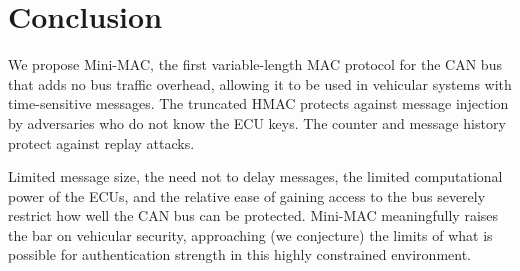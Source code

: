 \section{Conclusion}
\label{conclude}

We propose Mini-MAC, the first variable-length MAC protocol for the CAN bus that adds no bus traffic overhead, 
allowing it to be used in vehicular systems with time-sensitive messages.  The truncated HMAC protects against
message injection by adversaries who do not know the ECU keys.  The counter and message history protect
against replay attacks.  

Limited message size, the need not to delay messages, the limited computational power of the ECUs,
and the relative ease of gaining access to the bus 
severely restrict how well the CAN bus can be protected.  Mini-MAC meaningfully raises the bar on vehicular security,
approaching (we conjecture) the limits of what is possible for authentication strength in this highly
constrained environment.

